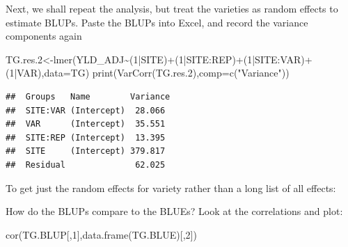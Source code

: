 \documentclass[
]{book}
\newenvironment{Shaded}{\begin{snugshade}}{\end{snugshade}}
\newcommand{\AttributeTok}[1]{\textcolor[rgb]{0.77,0.63,0.00}{#1}}
\newcommand{\DecValTok}[1]{\textcolor[rgb]{0.00,0.00,0.81}{#1}}
\newcommand{\FloatTok}[1]{\textcolor[rgb]{0.00,0.00,0.81}{#1}}
\newcommand{\FunctionTok}[1]{\textcolor[rgb]{0.00,0.00,0.00}{#1}}
\newcommand{\NormalTok}[1]{#1}
\newcommand{\OtherTok}[1]{\textcolor[rgb]{0.56,0.35,0.01}{#1}}
\newcommand{\SpecialCharTok}[1]{\textcolor[rgb]{0.00,0.00,0.00}{#1}}
\newcommand{\StringTok}[1]{\textcolor[rgb]{0.31,0.60,0.02}{#1}}
\begin{document}
Next, we shall repeat the analysis, but treat the varieties as random effects to estimate BLUPs. Paste the BLUPs into Excel, and record the variance components again

\begin{Shaded}
\begin{Highlighting}[]
\NormalTok{TG.res}\FloatTok{.2}\OtherTok{\textless{}{-}}\FunctionTok{lmer}\NormalTok{(YLD\_ADJ}\SpecialCharTok{\textasciitilde{}}\NormalTok{(}\DecValTok{1}\SpecialCharTok{|}\NormalTok{SITE)}\SpecialCharTok{+}\NormalTok{(}\DecValTok{1}\SpecialCharTok{|}\NormalTok{SITE}\SpecialCharTok{:}\NormalTok{REP)}\SpecialCharTok{+}\NormalTok{(}\DecValTok{1}\SpecialCharTok{|}\NormalTok{SITE}\SpecialCharTok{:}\NormalTok{VAR)}\SpecialCharTok{+}\NormalTok{(}\DecValTok{1}\SpecialCharTok{|}\NormalTok{VAR),}\AttributeTok{data=}\NormalTok{TG)}
\FunctionTok{print}\NormalTok{(}\FunctionTok{VarCorr}\NormalTok{(TG.res}\FloatTok{.2}\NormalTok{),}\AttributeTok{comp=}\FunctionTok{c}\NormalTok{(}\StringTok{"Variance"}\NormalTok{))}
\end{Highlighting}
\end{Shaded}

\begin{verbatim}
##  Groups   Name        Variance
##  SITE:VAR (Intercept)  28.066 
##  VAR      (Intercept)  35.551 
##  SITE:REP (Intercept)  13.395 
##  SITE     (Intercept) 379.817 
##  Residual              62.025
\end{verbatim}

To get just the random effects for variety rather than a long list of all effects:

\begin{Shaded}
\end{Shaded}

How do the BLUPs compare to the BLUEs? Look at the correlations and plot:

\begin{Shaded}
\begin{Highlighting}[]
\FunctionTok{cor}\NormalTok{(TG.BLUP[,}\DecValTok{1}\NormalTok{],}\FunctionTok{data.frame}\NormalTok{(TG.BLUE)[,}\DecValTok{2}\NormalTok{])}
\end{Highlighting}
\end{Shaded}
\end{document}
